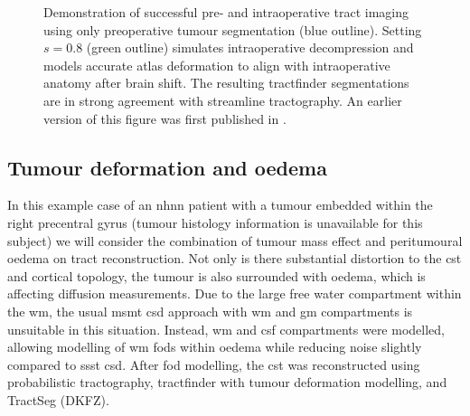 \documentclass[12pt,phd,a4paper,twoside]{ucl_thesis}
\renewcommand{\textcite}[2][]{
\ifthenelse { \equal {#1} {} }  {\citeauthor{#2}\autocite{#2}}   {\citeauthor{#1}\autocite{#2}}}
\begin{document}
\begin{figure}[h!]
  \centering
  
  \caption[Intraoperative tumour deformation and brain shift modelling]{Demonstration of successful pre- and intraoperative tract imaging using only preoperative tumour segmentation (blue outline). Setting $s=0.8$ (green outline) simulates intraoperative decompression and models accurate atlas deformation to align with intraoperative anatomy after brain shift. The resulting  tractfinder segmentations are in strong agreement with streamline tractography. An earlier version of this figure was first published in \textcite{Young2022}.}
  \label{fig:shrink}
\end{figure}

\subsection{Tumour deformation and oedema}

In this example case of an \gls{nhnn} patient with a tumour embedded within the right precentral gyrus (tumour histology information is unavailable for this subject) we will consider the combination of tumour mass effect and peritumoural oedema on tract reconstruction.
Not only is there substantial distortion to the \gls{cst} and cortical topology, the tumour is also surrounded with oedema, which is affecting diffusion measurements.
Due to the large free water compartment within the \gls{wm}, the usual \gls{msmt} \gls{csd} approach with \gls{wm} and \gls{gm} compartments is unsuitable in this situation.
Instead, \gls{wm} and \gls{csf} compartments were modelled, allowing modelling of \gls{wm} \glspl{fod} within oedema while reducing noise slightly compared to \gls{ssst} \gls{csd}.
After \gls{fod} modelling, the \gls{cst} was reconstructed using probabilistic tractography, tractfinder with tumour deformation modelling, and TractSeg (DKFZ).
\end{document}
